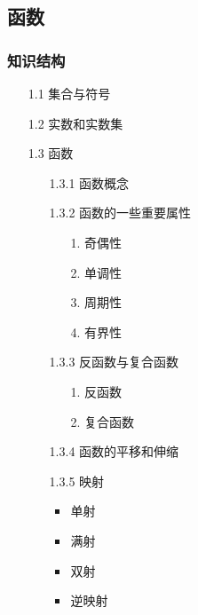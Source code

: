 \documentclass[12pt,UTF8]{ctexart}
\begin{document}
\subsection{函数}
\noindent
\subsubsection{知识结构}
	\begin{enumerate}
		\item[1.1] 集合与符号
		\item[1.2] 实数和实数集
		\item[1.3] 函数
			\begin{enumerate}
				\item[1.3.1] 函数概念
				\item[1.3.2] 函数的一些重要属性
					\begin{enumerate}
						\item[1.] 奇偶性
						\item[2.] 单调性
						\item[3.] 周期性
						\item[4.] 有界性
					\end{enumerate}
               \item[1.3.3] 反函数与复合函数
               	\begin{enumerate}
               		\item[1.] 反函数
               		\item[2.] 复合函数
               	\end{enumerate}
				\item[1.3.4] 函数的平移和伸缩
				\item[1.3.5] 映射
					\begin{itemize}
						\item 单射
						\item 满射
						\item 双射
						\item 逆映射
					\end{itemize}
			\end{enumerate}
	\end{enumerate}
\end{document}
